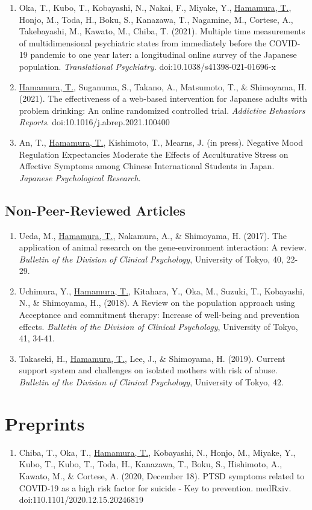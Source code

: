 \documentclass{article}
\begin{document}
\begin{enumerate}
	\item Oka, T., Kubo, T., Kobayashi, N., Nakai, F., Miyake, Y., \underline{Hamamura, T.}, Honjo, M., Toda, H., Boku, S., Kanazawa, T., Nagamine, M.,  Cortese, A., Takebayashi, M., Kawato, M., Chiba, T. (2021). Multiple time measurements of multidimensional psychiatric states from immediately before the COVID-19 pandemic to one year later: a longitudinal online survey of the Japanese population. \textit{Translational Psychiatry}. doi:10.1038/s41398-021-01696-x
	\item \underline{Hamamura, T.}, Suganuma, S., Takano, A., Matsumoto, T., \& Shimoyama, H. (2021). The effectiveness of a web-based intervention for Japanese adults with problem drinking: An online randomized controlled trial. \textit{Addictive Behaviors Reports}. doi:10.1016/j.abrep.2021.100400	
	\item An, T., \underline{Hamamura, T.}, Kishimoto, T., Mearns, J. (in press). Negative Mood Regulation Expectancies Moderate the Effects of Acculturative Stress on Affective Symptoms among Chinese International Students in Japan. \textit{Japanese Psychological Research}.
\end{enumerate}

\subsection{Non-Peer-Reviewed Articles}
\begin{enumerate}
	\item Ueda, M., \underline{Hamamura, T.}, Nakamura, A., \& Shimoyama, H. (2017). The application of animal research on the gene-environment interaction: A review. \textit{Bulletin of the Division of Clinical Psychology}, University of Tokyo, 40, 22-29.
	\item Uchimura, Y., \underline{Hamamura, T.}, Kitahara, Y., Oka, M., Suzuki, T., Kobayashi, N., \& Shimoyama, H., (2018). A Review on the population approach using Acceptance and commitment therapy: Increase of well-being and prevention effects. \textit{Bulletin of the Division of Clinical Psychology}, University of Tokyo, 41, 34-41.
	\item Takaseki, H., \underline{Hamamura, T.}, Lee, J., \& Shimoyama, H. (2019). Current support system and challenges on isolated mothers with risk of abuse. \textit{Bulletin of the Division of Clinical Psychology}, University of Tokyo, 42.
\end{enumerate}

\section{Preprints}
\begin{enumerate}
	\item Chiba, T., Oka, T., \underline{Hamamura, T.}, Kobayashi, N., Honjo, M., Miyake, Y., Kubo, T., Kubo, T., Toda, H., Kanazawa, T., Boku, S., Hishimoto, A., Kawato, M., \& Cortese, A. (2020, December 18). PTSD symptoms related to COVID-19 as a high risk factor for suicide - Key to prevention. medRxiv. doi:110.1101/2020.12.15.20246819
\end{enumerate}
	 
\end{document}
